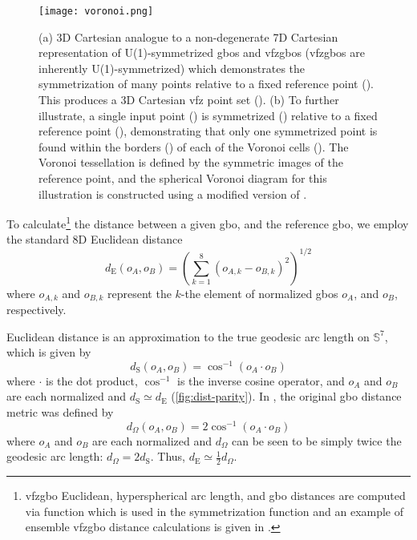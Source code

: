 \documentclass[final,twocolumn,12pt]{elsarticle}
\begin{document}
\begin{figure}
    \centering
    \texttt{[image: voronoi.png]}
    \caption{(a) 3D Cartesian analogue to a non-degenerate 7D Cartesian representation of U(1)-symmetrized \glspl{gbo} and \glspl{vfzgbo} (\glspl{vfzgbo} are inherently U(1)-symmetrized) which demonstrates the symmetrization of many points relative to a fixed reference point (). This produces a 3D Cartesian \gls{vfz} point set (\sympt{}). (b) To further illustrate, a single input point (\singlept{}) is symmetrized (\singlesympt{}) relative to a fixed reference point (), demonstrating that only one symmetrized point is found within the borders (\vbordercolor{}) of each of the Voronoi cells (\vcellcolor{}). The Voronoi tessellation is defined by the symmetric images of the reference point, and the spherical Voronoi diagram for this illustration is constructed using a modified version of \cite{luongVoronoiSphere2020}.}
    \label{fig:voronoi}
\end{figure}

To calculate\footnote{\Gls{vfzgbo} Euclidean, hyperspherical arc length, and \gls{gbo} distances are computed via \vfzorepo{} function  which is used in the symmetrization function  and an example of ensemble \gls{vfzgbo} distance calculations is given in .} the distance between a given \gls{gbo}, and the reference \gls{gbo}, we employ the standard 8D Euclidean distance
\begin{equation}
    \label{eq:8Deuclidean_dist}
    d_{\text{E}}\!\left(o_{A},o_{B}\right) = {\left(\sum_{k=1}^{8} {\left(o_{A,k} - o_{B,k}\right)}^2 \right)}^{1/2}
\end{equation}
where $o_{A,k}$ and $o_{B,k}$ represent the $k$-the element of normalized \glspl{gbo} $o_A$, and $o_B$, respectively. 

Euclidean distance is an approximation to the true geodesic arc length on $\mathbb{S}^7$, which is given by
\begin{equation}
    \label{eq:7sphere_arc_length}
    d_{\text{S}}\!\left(o_{A},o_{B}\right)=\cos ^{-1}\left(o_A\cdot o_B\right)
\end{equation}
where $\cdot$ is the dot product, $\cos ^{-1}$ is the inverse cosine operator, and $o_A$ and $o_B$ are each normalized and $d_{\text{S}}\simeq d_{\text{E}}$ (\cref{fig:dist-parity}). In \cite{francisGeodesicOctonionMetric2019}, the original \gls{gbo} distance metric was defined by
\begin{equation}
    \label{eq:omega}
    d_\Omega\!\left(o_{A},o_{B}\right) = 2\cos ^{-1}\left(o_A\cdot o_B\right)
\end{equation}
where $o_A$ and $o_B$ are each normalized and $d_\Omega$ can be seen to be simply twice the geodesic arc length: $d_\Omega = 2 d_{\text{S}}$. Thus,
$d_\text{E}\simeq \frac{1}{2}d_\Omega$.
\end{document}
